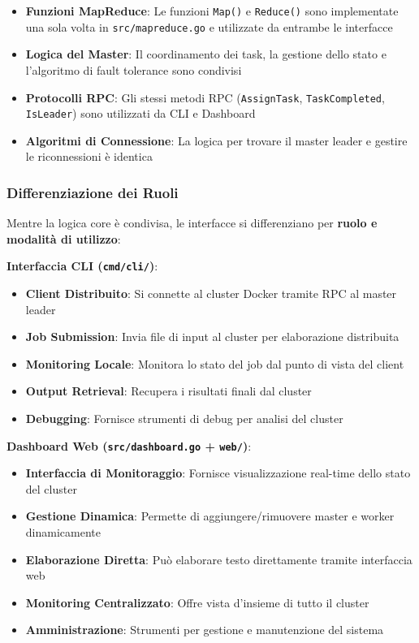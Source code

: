\documentclass[12pt,a4paper]{article}
\begin{document}
\begin{itemize}
\item \textbf{Funzioni MapReduce}: Le funzioni \texttt{Map()} e \texttt{Reduce()} sono implementate una sola volta in \texttt{src/mapreduce.go} e utilizzate da entrambe le interfacce
\item \textbf{Logica del Master}: Il coordinamento dei task, la gestione dello stato e l'algoritmo di fault tolerance sono condivisi
\item \textbf{Protocolli RPC}: Gli stessi metodi RPC (\texttt{AssignTask}, \texttt{TaskCompleted}, \texttt{IsLeader}) sono utilizzati da CLI e Dashboard
\item \textbf{Algoritmi di Connessione}: La logica per trovare il master leader e gestire le riconnessioni è identica
\end{itemize}

\subsubsection{Differenziazione dei Ruoli}

Mentre la logica core è condivisa, le interfacce si differenziano per \textbf{ruolo e modalità di utilizzo}:

\textbf{Interfaccia CLI (\texttt{cmd/cli/})}:
\begin{itemize}
\item \textbf{Client Distribuito}: Si connette al cluster Docker tramite RPC al master leader
\item \textbf{Job Submission}: Invia file di input al cluster per elaborazione distribuita
\item \textbf{Monitoring Locale}: Monitora lo stato del job dal punto di vista del client
\item \textbf{Output Retrieval}: Recupera i risultati finali dal cluster
\item \textbf{Debugging}: Fornisce strumenti di debug per analisi del cluster
\end{itemize}

\textbf{Dashboard Web (\texttt{src/dashboard.go} + \texttt{web/})}:
\begin{itemize}
\item \textbf{Interfaccia di Monitoraggio}: Fornisce visualizzazione real-time dello stato del cluster
\item \textbf{Gestione Dinamica}: Permette di aggiungere/rimuovere master e worker dinamicamente
\item \textbf{Elaborazione Diretta}: Può elaborare testo direttamente tramite interfaccia web
\item \textbf{Monitoring Centralizzato}: Offre vista d'insieme di tutto il cluster
\item \textbf{Amministrazione}: Strumenti per gestione e manutenzione del sistema
\end{itemize}
\end{document}
